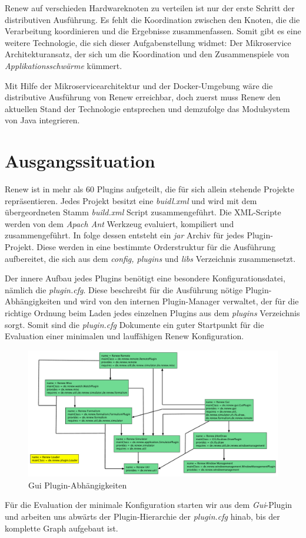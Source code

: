 Renew auf verschieden Hardwareknoten zu verteilen ist nur der erste Schritt der distributiven Ausführung. Es fehlt die Koordination zwischen den Knoten, die die Verarbeitung koordinieren und die Ergebnisse zusammenfassen. Somit gibt es eine weitere Technologie, die sich dieser Aufgabenstellung widmet: Der Mikroservice Architekturansatz, der sich um die Koordination und den Zusammenspiele von \textit{Applikationsschwärme} kümmert. \bigbreak

Mit Hilfe der Mikroservicearchitektur und der Docker-Umgebung wäre die distributive Ausführung von Renew erreichbar, doch zuerst muss Renew den aktuellen Stand der Technologie entsprechen und demzufolge das Modulsystem von Java integrieren.  


\section{Ausgangssituation} \label{sec:ausgangssituation} 

Renew ist in mehr als 60 Plugins aufgeteilt, die für sich allein stehende Projekte repräsentieren. Jedes Projekt besitzt eine \textit{buidl.xml} und wird mit dem übergeordneten Stamm \textit{build.xml} Script zusammengeführt. Die XML-Scripte werden von dem \textit{Apach Ant} Werkzeug evaluiert, kompiliert und zusammengeführt. In folge dessen entsteht ein \textit{jar} Archiv für jedes Plugin-Projekt. Diese werden in eine bestimmte Orderstruktur für die Ausführung aufbereitet, die sich aus dem \textit{config, plugins} und \textit{libs} Verzeichnis zusammensetzt. 
\bigbreak

Der innere Aufbau jedes Plugins benötigt eine besondere Konfigurationsdatei, nämlich die \textit{plugin.cfg}. Diese beschreibt für die Ausführung nötige Plugin-Abhängigkeiten und wird von den internen Plugin-Manager verwaltet, der für die richtige Ordnung beim Laden jedes einzelnen Plugins aus dem \textit{plugins} Verzeichnis sorgt. Somit sind die \textit{plugin.cfg} Dokumente ein guter Startpunkt für die Evaluation einer minimalen und lauffähigen Renew Konfiguration. 
\bigbreak
\begin{figure}[h!]
  \centering
  \includegraphics[width=\textwidth]{material/images/renew_plugin_dependencies2.pdf}
  \caption{Gui Plugin-Abhängigkeiten}
  \label{fig:plugin_deps}
\end{figure}
Für die Evaluation der minimale Konfiguration starten wir aus dem \textit{Gui}-Plugin und arbeiten uns abwärts der Plugin-Hierarchie der \textit{plugin.cfg} hinab, bis der komplette Graph aufgebaut ist.


